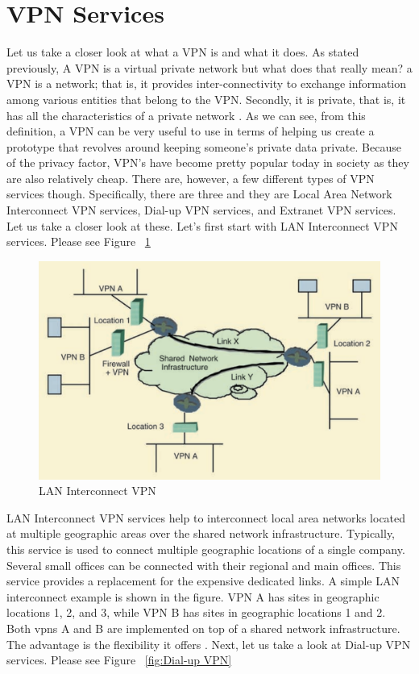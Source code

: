 \section{VPN Services}
\label{sec:VPN services}



Let us take a closer look at what a VPN is and what it does. As stated previously, A VPN is a virtual private network but what does that really mean? a VPN is a network; that is, it provides inter-connectivity to exchange information among various entities that belong to the VPN. Secondly, it is private, that is, it has all the characteristics of a private network \cite{venkateswaran2001virtual}.
As we can see, from this definition, a VPN can be very useful to use in terms of helping us create a prototype that revolves around keeping someone's private data private. Because of the privacy factor, VPN's have become pretty popular today in society as they are also relatively cheap. There are, however, a few different types of VPN services though. Specifically, there are three and they are Local Area Network Interconnect VPN services, Dial-up VPN services, and Extranet VPN services. Let us take a closer look at these. Let's first start with LAN Interconnect VPN services. Please see Figure ~\ref{fig:lan interconnect VPN}

\bigskip
\begin{figure}[hbt!]
\centering
\includegraphics[width=5in]{../images/LAN-interconnect-VPN.png}%
\caption{LAN Interconnect VPN}
\label{fig:lan interconnect VPN}
\end{figure}
\bigskip

LAN Interconnect VPN services help to interconnect local area networks located at multiple geographic areas over the shared network infrastructure. Typically, this service is used to connect multiple geographic locations of a single company. Several small offices can be connected with their regional and main offices. This service provides a replacement for the expensive dedicated links. A simple LAN interconnect example is shown in the figure. VPN A has sites in geographic locations 1, 2, and 3, while VPN B has sites in geographic locations 1 and 2. Both vpns A and B are implemented on top of a shared network infrastructure. The advantage is the flexibility it offers \cite{venkateswaran2001virtual}.
Next, let us take a look at Dial-up VPN services. Please see Figure ~\ref{fig:Dial-up VPN}

